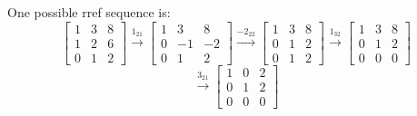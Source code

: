 \documentclass{scrartcl}
\begin{document}
\begin{enumerate}
One possible rref sequence is:
$$\begin{bmatrix}
	1 & 3 & 8 \\ 1 & 2 & 6 \\ 0 & 1 & 2
\end{bmatrix} \stackrel{1_{21}}{\rightarrow} \begin{bmatrix}
	1 & 3 & 8 \\ 0 & -1 & -2 \\ 0 & 1 & 2
\end{bmatrix} \stackrel{-2_{22}}{\rightarrow} \begin{bmatrix}
	1 & 3 & 8 \\ 0 & 1 & 2 \\ 0 & 1 & 2 
\end{bmatrix} \stackrel{1_{32}}{\rightarrow} \begin{bmatrix}
	1 & 3 & 8 \\ 0 & 1 & 2 \\ 0 & 0 & 0
\end{bmatrix}$$
$$\stackrel{3_{21}}{\rightarrow} \begin{bmatrix}
	1 & 0 & 2 \\ 0 & 1 & 2 \\ 0 & 0 & 0
\end{bmatrix}$$

\end{enumerate}
\end{document}
